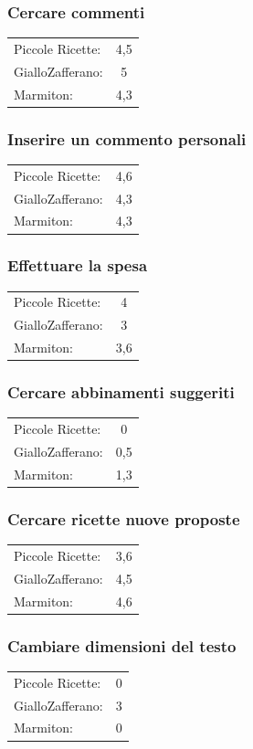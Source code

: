 \subsubsection{Cercare commenti}
\begin{tabular}{l c}
Piccole Ricette: & 4,5\\
GialloZafferano: & 5\\
Marmiton: & 4,3\\
\end{tabular}

\subsubsection{Inserire un commento personali}
\begin{tabular}{l c}
Piccole Ricette: & 4,6\\
GialloZafferano: & 4,3\\
Marmiton: & 4,3\\
\end{tabular}

\subsubsection{Effettuare la spesa}
\begin{tabular}{l c}
Piccole Ricette: & 4\\
GialloZafferano: & 3\\
Marmiton: & 3,6\\
\end{tabular}

\subsubsection{Cercare abbinamenti suggeriti}
\begin{tabular}{l c}
Piccole Ricette: & 0\\
GialloZafferano: & 0,5\\
Marmiton: & 1,3\\
\end{tabular}

\subsubsection{Cercare ricette nuove proposte}
\begin{tabular}{l c}
Piccole Ricette: & 3,6\\
GialloZafferano: & 4,5\\
Marmiton: & 4,6\\
\end{tabular}

\subsubsection{Cambiare dimensioni del testo}
\begin{tabular}{l c}
Piccole Ricette: & 0\\
GialloZafferano: & 3\\
Marmiton: & 0\\
\end{tabular}

